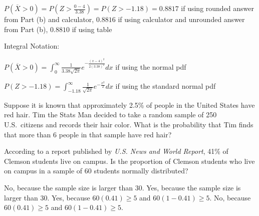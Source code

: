 \documentclass[noanswers]{exam}
\begin{document}
\begin{questions}
\begin{parts}
\begin{solution}[\stretch{1}]

\vspace{3mm}

$P(\overline{X}>0)=P\left(Z>\frac{0-4}{3.38}\right)=P(Z>-1.18)=0.8817$ if using rounded answer from Part (b) and calculator, $0.8816$ if using calculator and unrounded answer from Part (b), $0.8810$ if using table

\vspace{3mm}

Integral Notation:

\vspace{1mm}

$P(\overline{X}>0)=\int_0^{\infty}\frac{1}{3.38\sqrt{2\pi}}e^{-\frac{(x-4)^2}{2(3.38)^2}}dx$ if using the normal pdf

$P(Z>-1.18)=\int_{-1.18}^{\infty}\frac{1}{\sqrt{2\pi}}e^{-\frac{x^2}{2}}dx$ if using the standard normal pdf

\vspace{3mm}
\end{solution}
\end{parts}

\newpage

\question Suppose it is known that approximately 2.5\% of people in the United States have red hair. Tim the Stats Man decided to take a random sample of 250 U.S.\ citizens and records their hair color. What is the probability that Tim finds that more than 6 people in that sample have red hair?

\vspace{3mm}

\begin{choices}
\end{choices}

\vspace{3mm}

\question According to a report published by \textit{U.S. News and World Report}, 41\% of Clemson students live on campus. Is the proportion of Clemson students who live on campus in a sample of 60 students normally distributed?

\vspace{3mm}

\begin{choices}
\choice No, because the sample size is larger than 30.
\choice Yes, because the sample size is larger than 30.
\CorrectChoice Yes, because $60(0.41)\geq 5$ and $60(1-0.41)\geq5$.
\choice No, because $60(0.41)\geq 5$ and $60(1-0.41)\geq5$.
\end{choices}


\end{questions}
\end{document}
